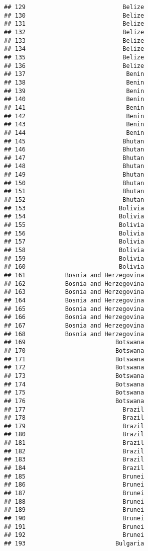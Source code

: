 \documentclass[]{article}
\begin{document}
\begin{verbatim}
## 129                           Belize
## 130                           Belize
## 131                           Belize
## 132                           Belize
## 133                           Belize
## 134                           Belize
## 135                           Belize
## 136                           Belize
## 137                            Benin
## 138                            Benin
## 139                            Benin
## 140                            Benin
## 141                            Benin
## 142                            Benin
## 143                            Benin
## 144                            Benin
## 145                           Bhutan
## 146                           Bhutan
## 147                           Bhutan
## 148                           Bhutan
## 149                           Bhutan
## 150                           Bhutan
## 151                           Bhutan
## 152                           Bhutan
## 153                          Bolivia
## 154                          Bolivia
## 155                          Bolivia
## 156                          Bolivia
## 157                          Bolivia
## 158                          Bolivia
## 159                          Bolivia
## 160                          Bolivia
## 161           Bosnia and Herzegovina
## 162           Bosnia and Herzegovina
## 163           Bosnia and Herzegovina
## 164           Bosnia and Herzegovina
## 165           Bosnia and Herzegovina
## 166           Bosnia and Herzegovina
## 167           Bosnia and Herzegovina
## 168           Bosnia and Herzegovina
## 169                         Botswana
## 170                         Botswana
## 171                         Botswana
## 172                         Botswana
## 173                         Botswana
## 174                         Botswana
## 175                         Botswana
## 176                         Botswana
## 177                           Brazil
## 178                           Brazil
## 179                           Brazil
## 180                           Brazil
## 181                           Brazil
## 182                           Brazil
## 183                           Brazil
## 184                           Brazil
## 185                           Brunei
## 186                           Brunei
## 187                           Brunei
## 188                           Brunei
## 189                           Brunei
## 190                           Brunei
## 191                           Brunei
## 192                           Brunei
## 193                         Bulgaria

\end{verbatim}
\end{document}
